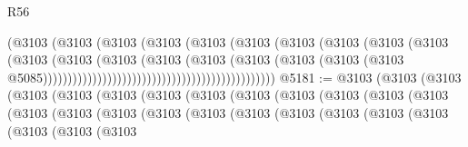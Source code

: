 \begin{lexlean}{R56}
\begin{coremodule}
{{{{{{{{{{{{{{{{{{{{{{{{{{{{{{{{{{{{{{{{{{{{{{{{{{{{{{{{{{{{{{{{{{{{{{{{{{{{{{{{{{{{{{{{{{{{{{{{{{{{{{{{{{{{{{{{{{{{{{{{{{{{{{{{{{{{{{{{{{{{{{{{{{{{{{{{{{{{{{{{{{{{{{{{{{{{{{{{{{{{{{{{{{{{{{{{{{{{{{{{{{{{{{{{{{{                                                            (@3103
                                                              (@3103
                                                                (@3103
                                                                  (@3103
                                                                    (@3103
                                                                      (@3103
                                                                        (@3103
                                                                          (@3103
                                                                            (@3103
                                                                              (@3103
                                                                                (@3103
                                                                                  (@3103
                                                                                    (@3103
                                                                                      (@3103
                                                                                        (@3103
                                                                                          (@3103
                                                                                            (@3103
                                                                                              (@3103
                                                                                                (@3103
                                                                                                  @5085)))))))))))))))))))))))))))))))))))))))))))))))
@5181 := @3103
    (@3103
      (@3103
        (@3103
          (@3103
            (@3103
              (@3103
                (@3103
                  (@3103
                    (@3103
                      (@3103
                        (@3103
                          (@3103
                            (@3103
                              (@3103
                                (@3103
                                  (@3103
                                    (@3103
                                      (@3103
                                        (@3103
                                          (@3103
                                            (@3103
                                              (@3103
                                                (@3103
                                                  (@3103
                                                    (@3103
}}}}}}}}}}}}}}}}}}}}}}}}}}}}}}}}}}}}}}}}}}}}}}}}}}}}}}}}}}}}}}}}}}}}}}}}}}}}}}}}}}}}}}}}}}}}}}}}}}}}}}}}}}}}}}}}}}}}}}}}}}}}}}}}}}}}}}}}}}}}}}}}}}}}}}}}}}}}}}}}}}}}}}}}}}}}}}}}}}}}}}}}}}}}}}}}}}}}}}}}}}}}}}}}}}}
\end{coremodule}
\end{lexlean}
